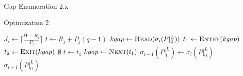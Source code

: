 \documentclass{beamer}
\begin{document}
\begin{section}{Gap-Enumeration 2.x}
\begin{frame}{Optimization 2}
    \begin{algorithm}[H]
    \begin{multicols}{2}
      {\tiny
      \begin{algorithmic}[2]
          \State $J_{i} \gets \lceil\frac{W - R_{j}}{P_{j}}\rceil$
            \State $t \gets R_{j} + P_{j}(q-1)$
            \State $kgap \gets \Call{Head}{\sigma_{i}(P|_{0}^{L})}$
            \State $t_{1} \gets \Call{Entry}{kgap}$
            \State $t_{2} \gets \Call{Exit}{kgap}$
                \State \Return $\emptyset$
              \EndIf
                \State $t \gets t_{1}$
              \EndIf
                    \State {$[t_{1},t_{2}) \gets [t_{1},t)$}
                  \Else
                    \State {\Call{Splice-Out}{$\sigma_{i}(P|_{0}^{L}), [t_{1},t_{2})$}}
                  \EndIf
                    \ExitWhile
                  \EndIf
                \EndIf
                    \State {$[t_{1},t_{2}) \gets [t + C_{j},t_{2})$}
                      \State \Call{Splice-In}{$\sigma_{i}(P|_{0}^{L}), [t_{1},t)$}
                    \EndIf
                  \ExitWhile
                \EndIf
              \EndIf
                \State $kgap \gets \Call{Next}{t_{1}}$
              \EndIf
            \EndWhile
          \EndFor
          \State $\sigma_{i-1}(P|_{0}^{L}) \gets \sigma_{i}(P|_{0}^{L})$
          \State \Return $\sigma_{i-1}(P|_{0}^{L})$
        \EndFunction
      \end{algorithmic}
    }
    \end{multicols}
  \end{algorithm}
\end{frame}


\end{section}
\end{document}
